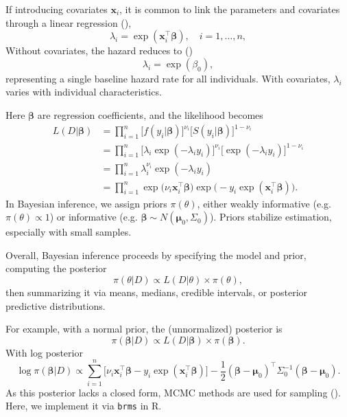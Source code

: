 If introducing covariates $\mathbf{x}_i$, it is common to link the parameters and covariates through a linear regression (\cite{ibrahim2013bayesian}),
$$
\lambda_i = \exp(\mathbf{x}_i^\top \boldsymbol{\beta}),
\quad i = 1, \ldots, n,
$$
Without covariates, the hazard reduces to (\cite{chen2025survival})
$$
\lambda_i = \exp(\beta_0),
$$
representing a single baseline hazard rate for all individuals. With covariates, $\lambda_i$ varies with individual characteristics.

Here $\boldsymbol{\beta}$ are regression coefficients, and the likelihood becomes
\begin{align*}
L(D | \boldsymbol{\beta})
&= \prod_{i=1}^n 
\big[ f(y_i | \boldsymbol{\beta}) \big]^{\nu_i}
\big[ S(y_i | \boldsymbol{\beta}) \big]^{1 - \nu_i} \\
&= \prod_{i=1}^n 
\big[ \lambda_i \exp(-\lambda_i y_i) \big]^{\nu_i}
\big[ \exp(-\lambda_i y_i) \big]^{1 - \nu_i} \\
&= \prod_{i=1}^n 
\lambda_i^{\nu_i} 
\exp(-\lambda_i y_i) \\
&= \prod_{i=1}^n 
\exp\big( \nu_i \mathbf{x}_i^\top \boldsymbol{\beta} \big)
\exp\big( - y_i \exp(\mathbf{x}_i^\top \boldsymbol{\beta}) \big).
\end{align*}
In Bayesian inference, we assign priors $\pi(\theta)$, either weakly informative (e.g. $\pi(\theta)\propto1$) or informative (e.g. $\boldsymbol{\beta} \sim N(\boldsymbol{\mu}_0, \Sigma_0)$). Priors stabilize estimation, especially with small samples.

Overall, Bayesian inference proceeds by specifying the model and prior, computing the posterior
$$
\pi(\theta | D)
\propto
L(D | \theta) \times \pi(\theta),
$$
then summarizing it via means, medians, credible intervals, or posterior predictive distributions.

For example, with a normal prior, the (unnormalized) posterior is
$$
\pi(\boldsymbol{\beta} | D)
\propto
L(D | \boldsymbol{\beta})
\times
\pi(\boldsymbol{\beta}).
$$
With log posterior
$$
\log \pi(\boldsymbol{\beta} | D)
\propto \sum_{i=1}^n
\big[ \nu_i \mathbf{x}_i^\top \boldsymbol{\beta}
- y_i \exp(\mathbf{x}_i^\top \boldsymbol{\beta}) \big]
- \frac{1}{2}
(\boldsymbol{\beta} - \boldsymbol{\mu}_0)^\top
\Sigma_0^{-1}
(\boldsymbol{\beta} - \boldsymbol{\mu}_0).
$$
As this posterior lacks a closed form, MCMC methods are used for sampling (\cite{stats5010006}). Here, we implement it via \texttt{brms} in R.






